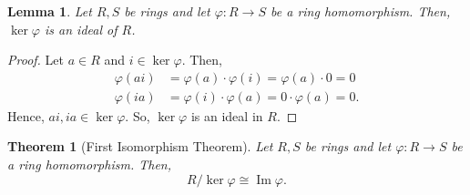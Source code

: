 \documentclass[a4paper, openany]{memoir}
\theoremstyle{definition}
\theoremstyle{plain}
\newtheorem{theorem}[definition]{Theorem}
\newtheorem{lemma}[definition]{Lemma}
\begin{document}
    \begin{lemma}
        Let $R, S$ be rings and let $\varphi \colon R \to S$ be a ring homomorphism. Then, $\ker \varphi$ is an ideal of $R$.
    \end{lemma}
    \begin{proof}
        Let $a \in R$ and $i \in \ker \varphi$. Then,
        \begin{align*}
            \varphi(ai) &= \varphi(a) \cdot \varphi(i) = \varphi(a) \cdot 0 = 0 \\
            \varphi(ia) &= \varphi(i) \cdot \varphi(a) = 0 \cdot \varphi(a) = 0.
        \end{align*}
        Hence, $ai, ia \in \ker \varphi$. So, $\ker \varphi$ is an ideal in $R$.
    \end{proof}

    \begin{theorem}[First Isomorphism Theorem]
        Let $R, S$ be rings and let $\varphi \colon R \to S$ be a ring homomorphism. Then, 
        \[R/\ker \varphi \cong \operatorname{Im} \varphi.\]
    \end{theorem}
\end{document}
